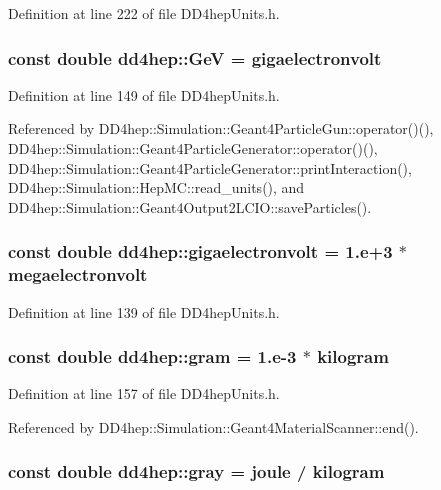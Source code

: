 Definition at line 222 of file DD4hepUnits.h.\hypertarget{namespacedd4hep_a3b49780cbe455fda1f6b8a58ff555ae5}{
\subsubsection[{GeV}]{\setlength{\rightskip}{0pt plus 5cm}const double {\bf dd4hep::GeV} = {\bf gigaelectronvolt}}}
\label{namespacedd4hep_a3b49780cbe455fda1f6b8a58ff555ae5}


Definition at line 149 of file DD4hepUnits.h.

Referenced by DD4hep::Simulation::Geant4ParticleGun::operator()(), DD4hep::Simulation::Geant4ParticleGenerator::operator()(), DD4hep::Simulation::Geant4ParticleGenerator::printInteraction(), DD4hep::Simulation::HepMC::read\_\-units(), and DD4hep::Simulation::Geant4Output2LCIO::saveParticles().\hypertarget{namespacedd4hep_ac36e148fcf16a0ffd9061c13ba225659}{
\subsubsection[{gigaelectronvolt}]{\setlength{\rightskip}{0pt plus 5cm}const double {\bf dd4hep::gigaelectronvolt} = 1.e+3 $\ast$ {\bf megaelectronvolt}}}
\label{namespacedd4hep_ac36e148fcf16a0ffd9061c13ba225659}


Definition at line 139 of file DD4hepUnits.h.\hypertarget{namespacedd4hep_ab7942148388bbfa1f47578732153f293}{
\subsubsection[{gram}]{\setlength{\rightskip}{0pt plus 5cm}const double {\bf dd4hep::gram} = 1.e-\/3 $\ast$ {\bf kilogram}}}
\label{namespacedd4hep_ab7942148388bbfa1f47578732153f293}


Definition at line 157 of file DD4hepUnits.h.

Referenced by DD4hep::Simulation::Geant4MaterialScanner::end().\hypertarget{namespacedd4hep_a35738d027f0d6649943f74cfc26bb7fc}{
\subsubsection[{gray}]{\setlength{\rightskip}{0pt plus 5cm}const double {\bf dd4hep::gray} = {\bf joule} / {\bf kilogram}}}
\label{namespacedd4hep_a35738d027f0d6649943f74cfc26bb7fc}


